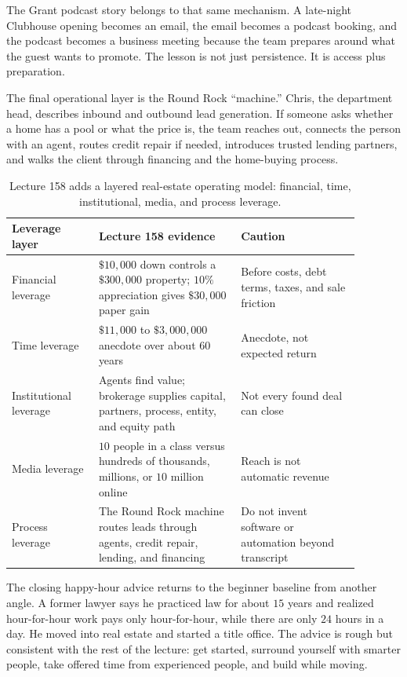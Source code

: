 \documentclass[11pt,oneside]{book}
\begin{document}
The Grant podcast story belongs to that same mechanism. A late-night Clubhouse opening becomes an email, the email becomes a podcast booking, and the podcast becomes a business meeting because the team prepares around what the guest wants to promote. The lesson is not just persistence. It is access plus preparation.

The final operational layer is the Round Rock ``machine.'' Chris, the department head, describes inbound and outbound lead generation. If someone asks whether a home has a pool or what the price is, the team reaches out, connects the person with an agent, routes credit repair if needed, introduces trusted lending partners, and walks the client through financing and the home-buying process.

\begin{table}
\centering
\small
\begin{tabular}{p{0.22\linewidth} p{0.36\linewidth} p{0.30\linewidth}}
\hline
Leverage layer & Lecture 158 evidence & Caution \\
\hline
Financial leverage & \(\$10{,}000\) down controls a \(\$300{,}000\) property; \(10\%\) appreciation gives \(\$30{,}000\) paper gain & Before costs, debt terms, taxes, and sale friction \\
Time leverage & \(\$11{,}000\) to \(\$3{,}000{,}000\) anecdote over about \(60\) years & Anecdote, not expected return \\
Institutional leverage & Agents find value; brokerage supplies capital, partners, process, entity, and equity path & Not every found deal can close \\
Media leverage & \(10\) people in a class versus hundreds of thousands, millions, or \(10\) million online & Reach is not automatic revenue \\
Process leverage & The Round Rock machine routes leads through agents, credit repair, lending, and financing & Do not invent software or automation beyond transcript \\
\hline
\end{tabular}
\caption{Lecture 158 adds a layered real-estate operating model: financial, time, institutional, media, and process leverage.}
\end{table}

The closing happy-hour advice returns to the beginner baseline from another angle. A former lawyer says he practiced law for about \(15\) years and realized hour-for-hour work pays only hour-for-hour, while there are only \(24\) hours in a day. He moved into real estate and started a title office. The advice is rough but consistent with the rest of the lecture: get started, surround yourself with smarter people, take offered time from experienced people, and build while moving.
\end{document}
